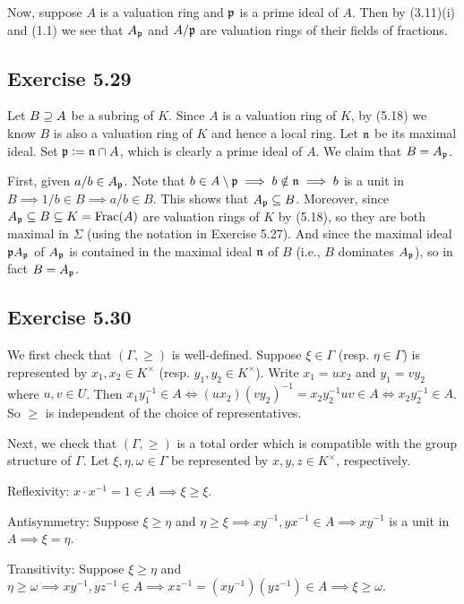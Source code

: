 \documentclass[../A&M.tex]{subfiles}
\begin{document}
Now, suppose $A$ is a valuation ring and $\mathfrak{p}$ is a prime ideal of $A$. Then by (3.11)(i) and (1.1) we see that $A_{\mathfrak{p}}$ and $A/\mathfrak{p}$ are valuation rings of their fields of fractions.

\subsection*{Exercise 5.29}

Let $B \supseteq A$ be a subring of $K$. Since $A$ is a valuation ring of $K$, by (5.18) we know $B$ is also a valuation ring of $K$ and hence a local ring. Let $\mathfrak{n}$ be its maximal ideal. Set $\mathfrak{p} := \mathfrak{n} \cap A$, which is clearly a prime ideal of $A$. We claim that $B = A_{\mathfrak{p}}$.

First, given $a/b \in A_{\mathfrak{p}}$. Note that $b \in A \setminus \mathfrak{p} \implies b \notin \mathfrak{n} \implies b$ is a unit in $B \implies 1/b \in B \implies a/b \in B$. This shows that $A_{\mathfrak{p}} \subseteq B$. Moreover, since $A_{\mathfrak{p}} \subseteq B \subseteq K = \operatorname{Frac}(A)$ are valuation rings of $K$ by (5.18), so they are both maximal in $\Sigma$ (using the notation in Exercise 5.27). And since the maximal ideal $\mathfrak{p} A_{\mathfrak{p}}$ of $A_{\mathfrak{p}}$ is contained in the maximal ideal $\mathfrak{n}$ of $B$ (i.e., $B$ dominates $A_{\mathfrak{p}}$), so in fact $B = A_{\mathfrak{p}}$.

\subsection*{Exercise 5.30}

We first check that $(\Gamma,\geq)$ is well-defined. Suppose $\xi \in \Gamma$ (resp. $\eta \in \Gamma$) is represented by $x_1,x_2 \in K^\times$ (resp. $y_1,y_2 \in K^\times$). Write $x_1=ux_2$ and $y_1=vy_2$ where $u,v \in U$. Then $x_1y_1^{-1} \in A \iff (ux_2)(vy_2)^{-1} = x_2y_2^{-1} uv \in A \iff x_2y_2^{-1} \in A$. So $\geq$ is independent of the choice of representatives.

Next, we check that $(\Gamma,\geq)$ is a total order which is compatible with the group structure of $\Gamma$. Let $\xi,\eta,\omega \in \Gamma$ be represented by $x,y,z \in K^\times$, respectively.

Reflexivity: $x \cdot x^{-1} = 1 \in A \implies \xi \geq \xi$. 

Antisymmetry: Suppose $\xi \geq \eta$ and $\eta \geq \xi \implies xy^{-1}, yx^{-1} \in A \implies xy^{-1}$ is a unit in $A \implies \xi = \eta$.

Transitivity: Suppose $\xi \geq \eta$ and $\eta \geq \omega \implies xy^{-1} , yz^{-1} \in A \implies xz^{-1} = (xy^{-1})(yz^{-1}) \in A \implies \xi \geq \omega$.
\end{document}
